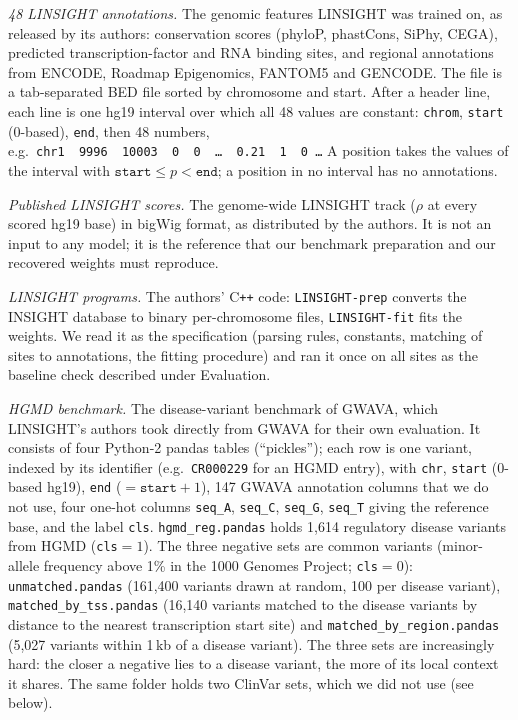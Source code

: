 \documentclass[11pt]{article}
\newcommand{\file}[1]{\nolinkurl{#1}}
\begin{document}
\emph{48 LINSIGHT annotations.} The genomic features LINSIGHT was trained on, as released by its authors:
conservation scores (phyloP, phastCons, SiPhy, CEGA), predicted transcription-factor and RNA binding sites,
and regional annotations from ENCODE, Roadmap Epigenomics, FANTOM5 and GENCODE.
The file is a tab-separated BED file sorted by chromosome and start. After a header line, each line is one
hg19 interval over which all 48 values are constant: \texttt{chrom}, \texttt{start} (0-based),
\texttt{end}, then 48 numbers, e.g.\ \texttt{chr1\ \ 9996\ \ 10003\ \ 0\ \ 0\ \ \dots\ \ 0.21\ \ 1\ \ 0\ \dots}
A position takes the values of the interval with $\texttt{start}\le p<\texttt{end}$; a position in no
interval has no annotations.

\emph{Published LINSIGHT scores.} The genome-wide LINSIGHT track ($\rho$ at every scored hg19 base) in
bigWig format, as distributed by the authors. It is not an input to any model; it is the reference that
our benchmark preparation and our recovered weights must reproduce.

\emph{LINSIGHT programs.} The authors' C\texttt{++} code: \file{LINSIGHT-prep} converts the INSIGHT database
to binary per-chromosome files, \file{LINSIGHT-fit} fits the weights. We read it as the specification
(parsing rules, constants, matching of sites to annotations, the fitting procedure) and ran it once on all
sites as the baseline check described under Evaluation.

\emph{HGMD benchmark.} The disease-variant benchmark of GWAVA, which LINSIGHT's
authors took directly from GWAVA for their own evaluation. It consists of four
Python-2 pandas tables (``pickles''); each row is one variant, indexed by its identifier (e.g.\
\texttt{CR000229} for an HGMD entry), with \texttt{chr}, \texttt{start} (0-based hg19), \texttt{end}
(${}=\texttt{start}+1$), 147 GWAVA annotation columns that we do not use, four one-hot columns
\texttt{seq\_A}, \texttt{seq\_C}, \texttt{seq\_G}, \texttt{seq\_T} giving the reference base, and the label
\texttt{cls}. \file{hgmd_reg.pandas} holds 1,614 regulatory disease variants from HGMD (\texttt{cls}${}=1$). The three negative sets are common variants (minor-allele
frequency above 1\% in the 1000 Genomes Project; \texttt{cls}${}=0$): \file{unmatched.pandas}
(161,400 variants drawn at random, 100 per disease variant), \file{matched_by_tss.pandas} (16,140 variants
matched to the disease variants by distance to the nearest transcription start site) and
\file{matched_by_region.pandas} (5,027 variants within 1\,kb of a disease variant). The three sets are
increasingly hard: the closer a negative lies to a disease variant, the more of its local context it shares.
The same folder holds two ClinVar sets, which we did not use (see below).
\end{document}
